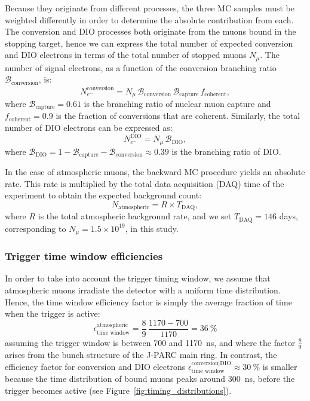 Because they originate from different processes, the three MC samples must be
weighted differently in order to determine the absolute contribution from each.
The conversion and DIO processes both originate from the muons bound in the
stopping target, hence we can express the total number of expected conversion
and DIO electrons in terms of the total number of stopped muons $N_\mu$.
The number of signal electrons, as a function of the conversion branching
ratio $\mathcal{B}_\mathrm{conversion}$, is:
$$
N_{e^-}^\mathrm{conversion} = 
N_\mu \, \mathcal{B}_\mathrm{conversion} \, 
\mathcal{B}_\mathrm{capture} \, f_\mathrm{coherent},
$$
where $\mathcal{B}_\mathrm{capture} = 0.61$ is the branching ratio of nuclear
muon capture and $f_\mathrm{coherent}=0.9$ is the
fraction of conversions that are coherent. Similarly, the total number of DIO
electrons can be expressed as:
$$
N_{e^-}^\mathrm{DIO} = N_\mu \, \mathcal{B}_\mathrm{DIO},
$$
where $\mathcal{B}_\mathrm{DIO} = 1 - \mathcal{B}_\mathrm{capture} -
\mathcal{B}_\mathrm{conversion} \approx 0.39$ is the branching ratio of DIO.


In the case of atmospheric muons, the backward MC procedure yields an absolute
rate. This rate is multiplied by the total data acquisition (DAQ) time of the
experiment to obtain the expected background count:
$$
N_\mathrm{atmospheric} = R \times T_\mathrm{DAQ},
$$
where $R$ is the total atmospheric background rate, and we set
$T_\mathrm{DAQ}=146$ days, corresponding to $N_\mu = 1.5\times 10^{19}$, in this
study. 

\subsubsection{Trigger time window efficiencies}
In order to take into account the trigger timing window, we assume that
atmospheric muons irradiate the detector with a uniform time distribution.
Hence, the time window efficiency factor is simply the average fraction of
time when the trigger is active:
$$
\epsilon_\text{time window}^\mathrm{atmospheric} =
\frac{8}{9}\,\frac{1170 - 700}{1170} = \SI{36}{\percent}
$$
assuming the trigger window is between 700 and \SI{1170}{\ns}, and where the
factor $\frac{8}{9}$ arises from the bunch structure of the J-PARC main ring. In
contrast, the efficiency factor for conversion and DIO electrons
$\epsilon_\text{time window}^\text{conversion|DIO} \approx \SI{30}{\percent}$ is
smaller because the time distribution of bound muons peaks around \SI{300}{\ns},
before the trigger becomes active (see Figure~\ref{fig:timing_distributions}).



